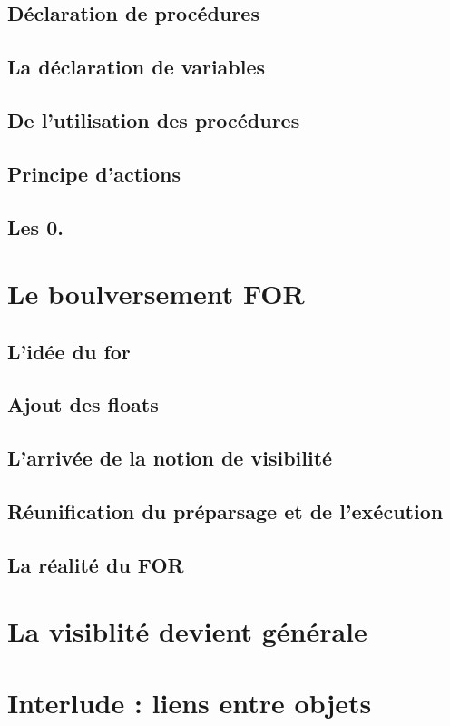 \documentclass[11pt]{report} %
\begin{document}
\subsection{Déclaration de procédures}
\subsection{La déclaration de variables} %
\subsection{De l'utilisation des procédures}%
\subsection{Principe d'actions} %
\subsection{Les 0.}

\section{Le boulversement FOR}
\subsection{L'idée du for}
\subsection{Ajout des floats}
\subsection{L'arrivée de la notion de visibilité}
\subsection{Réunification du préparsage et de l'exécution}
\subsection{La réalité du FOR}

\section{La visiblité devient générale}

\section{Interlude : liens entre objets}
\end{document}
